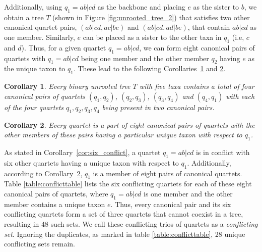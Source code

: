 \documentclass[10pt,a4paper]{article}
\newcommand{\addb}[1]{{\color{red} #1}}
\newtheorem{corollary}{Corollary}[theorem]
\begin{document}


Additionally, using $q_1 =ab|cd$ as the backbone and placing $e$ as the sister to $b$, we obtain a tree $T$ (shown in Figure \ref{fig:unrooted_tree_2}) that satisfies two other canonical quartet pairs, $(ab|cd, ac|be)$ and $(ab|cd, ad|be)$, that contain $ab|cd$ as one member. Similarly, $e$ can be placed as a sister to the other taxa in $q_1$ (i.e, $c$ and $d$). Thus, for a given quartet $q_1 = ab|cd$, we can form eight canonical pairs of quartets with $q_1 = ab|cd$ being one member and the other member $q_2$ having $e$ as the unique taxon to $q_1$. These lead to the following Corollaries~\ref{cor:two-pair-quartets} and \ref{cor:eight-pairs}.

\begin{corollary}
\label{cor:two-pair-quartets}
Every binary unrooted tree $T$ with five taxa contains a total of four canonical pairs of quartets $(q_1,q_2)$, $(q_2,q_3)$, $(q_3,q_4)$ and $(q_4,q_1)$ with each of the four quartets $q_1, q_2, q_3, q_4$ being present in two canonical pairs. %
\end{corollary}

\begin{corollary}
\label{cor:eight-pairs}
Every quartet is a part of eight canonical pairs of quartets with the other members of these pairs having a particular unique taxon with respect to $q_1$. 
\end{corollary}


As stated in Corollary~\ref{cor:six_conflict}, a quartet $q_1 = ab|cd$ is in conflict with six other quartets having a unique taxon with respect to $q_1$. Additionally, according to Corollary~\ref{cor:eight-pairs}, $q_1$ is a member of eight pairs of canonical quartets. Table \ref{table:conflicttable} lists the six conflicting quartets for each of these eight canonical pairs of quartets, where $q_1=ab|cd$ is one member and the other member contains a unique taxon $e$. Thus, every canonical pair and its six conflicting quartets form a set of three quartets that cannot coexist in a tree, resulting in 48 such sets. We call these conflicting trios of quartets as a \textit{conflicting set}. Ignoring the duplicates, as marked in table \ref{table:conflicttable}, 28 unique conflicting sets remain.
\end{document}
